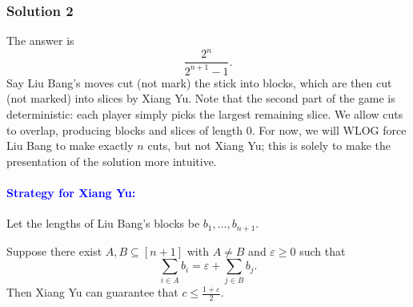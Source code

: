\documentclass[11pt]{article}
\begin{document}
\newpage
\subsubsection{Solution 2}
The answer is $$\boxed{\frac{2^n}{2^{n+1}-1}}.$$ Say Liu Bang's moves cut (not mark) the stick into blocks, which are then cut (not marked) into slices by Xiang Yu. Note that the second part of the game is deterministic: each player simply picks the largest remaining slice. We allow cuts to overlap, producing blocks and slices of length $0$. For now, we will WLOG force Liu Bang to make exactly $n$ cuts, but not Xiang Yu; this is solely to make the presentation of the solution more intuitive.
\paragraph{\textcolor{blue}{Strategy for Xiang Yu:}} Let the lengths of Liu Bang's blocks be $b_1,\ldots,b_{n+1}$.
\begin{claim}
    Suppose there exist $A,B \subseteq [n+1]$ with $A \neq B$ and $\varepsilon\geq 0$ such that
$$\sum_{i \in A} b_i=\varepsilon+\sum_{j \in B} b_j.$$Then Xiang Yu can guarantee that $c \leq \frac{1+\varepsilon}{2}$.
\end{claim}
\end{document}
